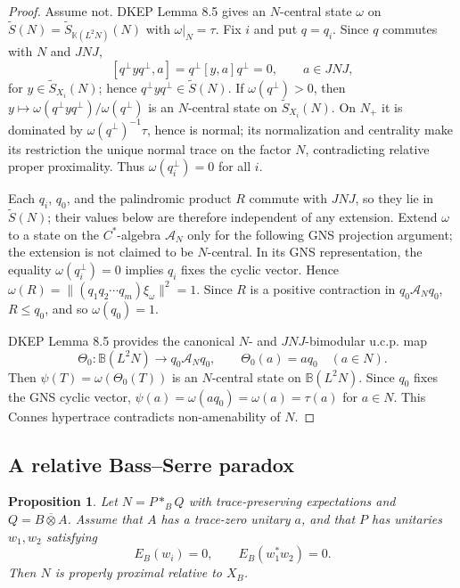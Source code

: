 \documentclass[12pt]{article}
\newtheorem{proposition}{Proposition}
\newcommand{\bbarotimes}{\mathbin{\overline{\otimes}}}
\newcommand{\cA}{\mathcal A}
\begin{document}
\begin{proof}
Assume not.  DKEP Lemma 8.5 gives an \(N\)-central state \(\omega\) on
\(\widetilde S(N)=\widetilde S_{\mathbb K(L^2N)}(N)\) with
\(\omega|_N=\tau\).  Fix \(i\) and put \(q=q_i\).  Since \(q\) commutes with
\(N\) and \(JNJ\),
\[
 [q^\perp yq^\perp,a]=q^\perp[y,a]q^\perp=0,\qquad a\in JNJ,
\]
for \(y\in\widetilde S_{X_i}(N)\); hence \(q^\perp yq^\perp\in\widetilde
S(N)\).  If \(\omega(q^\perp)>0\), then
\(y\mapsto \omega(q^\perp yq^\perp)/\omega(q^\perp)\) is an \(N\)-central state
on \(\widetilde S_{X_i}(N)\).  On \(N_+\) it is dominated by
\(\omega(q^\perp)^{-1}\tau\), hence is normal; its normalization and centrality
make its restriction the unique normal trace on the factor \(N\), contradicting
relative proper proximality.  Thus \(\omega(q_i^\perp)=0\) for all \(i\).

Each \(q_i\), \(q_0\), and the palindromic product \(R\) commute with \(JNJ\),
so they lie in \(\widetilde S(N)\); their values below are therefore independent
of any extension.  Extend \(\omega\) to a state on the \(C^*\)-algebra
\(\cA_N\) only for the following GNS projection argument; the extension is not
claimed to be \(N\)-central.  In its GNS representation, the equality
\(\omega(q_i^\perp)=0\) implies \(q_i\) fixes the cyclic vector.  Hence
\(\omega(R)=\|(q_1q_2\cdots q_m)\xi_\omega\|^2=1\).  Since \(R\) is a positive
contraction in \(q_0\cA_Nq_0\), \(R\le q_0\), and so \(\omega(q_0)=1\).

DKEP Lemma 8.5 provides the canonical \(N\)- and \(JNJ\)-bimodular u.c.p. map
\[
        \Theta_0:\mathbb B(L^2N)\to q_0\cA_Nq_0,\qquad
        \Theta_0(a)=aq_0\quad(a\in N).
\]
Then \(\psi(T)=\omega(\Theta_0(T))\) is an \(N\)-central state on
\(\mathbb B(L^2N)\).  Since \(q_0\) fixes the GNS cyclic vector,
\(\psi(a)=\omega(aq_0)=\omega(a)=\tau(a)\) for \(a\in N\).  This Connes
hypertrace contradicts non-amenability of \(N\).
\end{proof}

\subsection*{A relative Bass--Serre paradox}

\begin{proposition}\label{prop:BS}
Let \(N=P*_{B}Q\) with trace-preserving expectations and \(Q=B\bbarotimes A\).
Assume that \(A\) has a trace-zero unitary \(a\), and that \(P\) has unitaries
\(w_1,w_2\) satisfying
\[
        E_B(w_i)=0,\qquad E_B(w_1^*w_2)=0 .
\]
Then \(N\) is properly proximal relative to \(X_B\).
\end{proposition}
\end{document}

